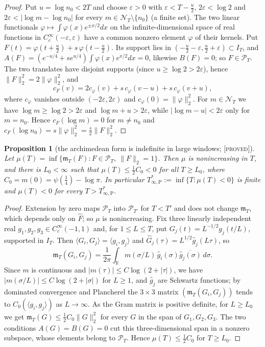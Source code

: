 \documentclass[11pt]{amsart}
\newtheorem{proposition}[theorem]{Proposition}
\theoremstyle{definition}
\theoremstyle{remark}
\numberwithin{equation}{section}
\newcommand{\R}{\mathbb{R}}
\newcommand{\IT}{I_T}                                  %
\newcommand{\Fh}{\widehat F}                           %
\newcommand{\cF}{c_F}                                  %
\newcommand{\PT}{\mathcal{P}_T}                        %
\newcommand{\NT}{\mathcal{N}_T}                        %
\newcommand{\mT}{\mathfrak{m}_T}                       %
\newcommand{\Tarch}{T^{*}_{\infty,\mathrm P}}          %
\newcommand{\stag}[1]{\textsc{[#1]}}
\newcommand{\PROVED}{\stag{proved}}
\begin{document}
\begin{proof}
Put $u=\log n_0<2T$ and choose $\varepsilon>0$ with $\varepsilon<T-\frac u2$, $2\varepsilon<\log2$ and
$2\varepsilon<|\log m-\log n_0|$ for every $m\in\NT\setminus\{n_0\}$ (a finite set). The two linear
functionals $\varphi\mapsto\int\varphi(x)e^{\pm x/2}dx$ on the infinite-dimensional space of real functions in
$C_c^\infty(-\varepsilon,\varepsilon)$ have a common nonzero element $\varphi$ of their kernels. Put
$F(t)=\varphi(t+\frac u2)+s\,\varphi(t-\frac u2)$. Its support lies in $(-\frac u2-\varepsilon,\frac u2+\varepsilon)
\subset\IT$, and $A(F)=(e^{-u/4}+se^{u/4})\int\varphi(x)e^{x/2}dx=0$, likewise $B(F)=0$; so $F\in\PT$. The two
translates have disjoint supports (since $u\ge\log2>2\varepsilon$), hence $\|F\|_2^2=2\|\varphi\|_2^2$, and
\[
  \cF(v)=2c_\varphi(v)+s\,c_\varphi(v-u)+s\,c_\varphi(v+u),
\]
where $c_\varphi$ vanishes outside $(-2\varepsilon,2\varepsilon)$ and $c_\varphi(0)=\|\varphi\|_2^2$. For
$m\in\NT$ we have $\log m\ge\log2>2\varepsilon$ and $\log m+u>2\varepsilon$, while
$|\log m-u|<2\varepsilon$ only for $m=n_0$. Hence $\cF(\log m)=0$ for $m\ne n_0$ and
$\cF(\log n_0)=s\|\varphi\|_2^2=\frac s2\|F\|_2^2$.
\end{proof}

\begin{proposition}[the archimedean form is indefinite in large windows; \PROVED]\label{w3:prop:archneg}
Let $\mu(T)=\inf\{\mT(F):F\in\PT,\ \|F\|_2=1\}$. Then $\mu$ is nonincreasing in $T$, and there is $L_0<\infty$
such that $\mu(T)\le\frac12C_0<0$ for all $T\ge L_0$, where $C_0=m(0)=\psi(\frac14)-\log\pi$. In particular
$\Tarch:=\inf\{T:\mu(T)<0\}$ is finite and $\mu(T)<0$ for every $T>\Tarch$.
\end{proposition}

\begin{proof}
Extension by zero maps $\mathcal P_{T}$ into $\mathcal P_{T'}$ for $T<T'$ and does not change $\mT$, which
depends only on $\Fh$; so $\mu$ is nonincreasing. Fix three linearly independent real
$g_1,g_2,g_3\in C_c^\infty(-1,1)$ and, for $1\le L\le T$, put $G_j(t)=L^{-1/2}g_j(t/L)$, supported in $\IT$.
Then $\langle G_i,G_j\rangle=\langle g_i,g_j\rangle$ and $\widehat G_j(\tau)=L^{1/2}\widehat g_j(L\tau)$, so
\[
  \mT(G_i,G_j)=\frac1{2\pi}\int_\R m(\sigma/L)\,\widehat g_i(\sigma)\overline{\widehat g_j(\sigma)}\,d\sigma .
\]
Since $m$ is continuous and $|m(\tau)|\le C\log(2+|\tau|)$, we have $|m(\sigma/L)|\le C\log(2+|\sigma|)$ for
$L\ge1$, and $\widehat g_j$ are Schwartz functions; by dominated convergence and Plancherel the $3\times3$
matrix $(\mT(G_i,G_j))$ tends to $C_0(\langle g_i,g_j\rangle)$ as $L\to\infty$. As the Gram matrix is positive
definite, for $L\ge L_0$ we get $\mT(G)\le\frac12C_0\|G\|_2^2$ for every $G$ in the span of $G_1,G_2,G_3$. The
two conditions $A(G)=B(G)=0$ cut this three-dimensional span in a nonzero subspace, whose elements belong to
$\PT$. Hence $\mu(T)\le\frac12C_0$ for $T\ge L_0$.
\end{proof}
\end{document}
